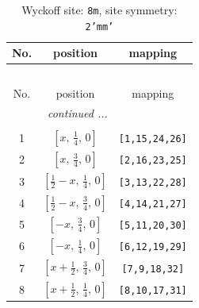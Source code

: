 \documentclass[fleqn,8pt]{jsarticle}
\begin{document}
\begin{longtable}{ccc}
\caption{Wyckoff site: {\tt 8m}, site symmetry: {\tt 2'mm'}}
 \\
 \hline \hline
No. & position & mapping \\ \hline \endfirsthead

\multicolumn{2}{l}{\tablename\ \thetable{}} \\
 \hline \hline
No. & position & mapping \\ \hline \endhead

 \hline \hline
\multicolumn{2}{r}{\footnotesize\it continued ...} \\ \endfoot

 \hline \hline
\multicolumn{2}{r}{} \\ \endlastfoot

1 & $\left[ x,\, \frac{1}{4},\, 0 \right]$ & {\tt [1,15,24,26]} \\ \hline
2 & $\left[ x,\, \frac{3}{4},\, 0 \right]$ & {\tt [2,16,23,25]} \\ \hline
3 & $\left[ \frac{1}{2} - x,\, \frac{1}{4},\, 0 \right]$ & {\tt [3,13,22,28]} \\ \hline
4 & $\left[ \frac{1}{2} - x,\, \frac{3}{4},\, 0 \right]$ & {\tt [4,14,21,27]} \\ \hline
5 & $\left[ - x,\, \frac{3}{4},\, 0 \right]$ & {\tt [5,11,20,30]} \\ \hline
6 & $\left[ - x,\, \frac{1}{4},\, 0 \right]$ & {\tt [6,12,19,29]} \\ \hline
7 & $\left[ x + \frac{1}{2},\, \frac{3}{4},\, 0 \right]$ & {\tt [7,9,18,32]} \\ \hline
8 & $\left[ x + \frac{1}{2},\, \frac{1}{4},\, 0 \right]$ & {\tt [8,10,17,31]} \\
\end{longtable}
\renewcommand{\arraystretch}{1.2}
\end{document}
